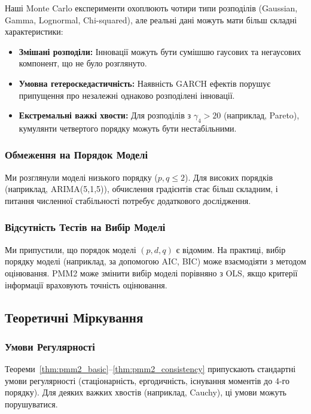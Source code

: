 \documentclass[12pt,a4paper]{article}
\begin{document}
Наші Monte Carlo експерименти охоплюють чотири типи розподілів (Gaussian, Gamma, Lognormal, Chi-squared), але реальні дані можуть мати більш складні характеристики:

\begin{itemize}
    \item \textbf{Змішані розподіли:} Інновації можуть бути сумішшю гаусових та негаусових компонент, що не було розглянуто.
    \item \textbf{Умовна гетероскедастичність:} Наявність GARCH ефектів порушує припущення про незалежні однаково розподілені інновації.
    \item \textbf{Екстремальні важкі хвости:} Для розподілів з $\gamma_4 > 20$ (наприклад, Pareto), кумулянти четвертого порядку можуть бути нестабільними.
\end{itemize}

\subsubsection{Обмеження на Порядок Моделі}

Ми розглянули моделі низького порядку ($p, q \leq 2$). Для високих порядків (наприклад, ARIMA(5,1,5)), обчислення градієнтів стає більш складним, і питання численної стабільності потребує додаткового дослідження.

\subsubsection{Відсутність Тестів на Вибір Моделі}

Ми припустили, що порядок моделі $(p, d, q)$ є відомим. На практиці, вибір порядку моделі (наприклад, за допомогою AIC, BIC) може взаємодіяти з методом оцінювання. PMM2 може змінити вибір моделі порівняно з OLS, якщо критерії інформації враховують точність оцінювання.

\subsection{Теоретичні Міркування}
\label{subsec:theoretical_considerations}

\subsubsection{Умови Регулярності}

Теореми~\ref{thm:pmm2_basic}--\ref{thm:pmm2_consistency} припускають стандартні умови регулярності (стаціонарність, ергодичність, існування моментів до 4-го порядку). Для деяких важких хвостів (наприклад, Cauchy), ці умови можуть порушуватися.
\end{document}
